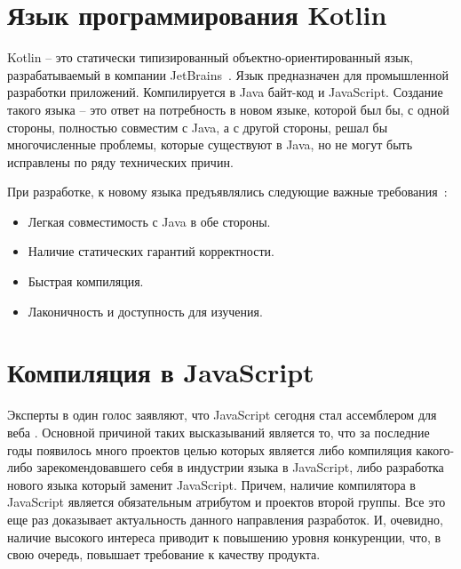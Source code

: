 


\section{Язык программирования Kotlin}

Kotlin -- это статически типизированный объектно-ориентированный язык, разрабатываемый в компании JetBrains~\cite{KotlinOSP}.
Язык предназначен для промышленной разработки приложений. Компилируется в Java байт-код и JavaScript.
Создание такого языка -- это ответ на потребность в новом языке, которой был бы, с одной стороны, полностью совместим с Java, а с другой стороны, решал бы многочисленные проблемы, которые существуют в Java, но не могут быть исправлены по ряду технических причин.

При разработке, к новому языка предъявлялись следующие важные требования~\cite{KotlinOSP}:
\begin{itemize}
	\item Легкая совместимость с Java в обе стороны.
	\item Наличие статических гарантий корректности.
	\item Быстрая компиляция.
	\item Лаконичность и доступность для изучения.
\end{itemize}






\section{Компиляция в JavaScript}

Эксперты в один голос заявляют, что JavaScript сегодня стал ассемблером для веба \cite{JsIsAsm1, JsIsAsm2}.
Основной причиной таких высказываний является то, что за последние годы появилось много проектов целью которых является либо компиляция какого-либо зарекомендовавшего себя в индустрии языка в JavaScript, либо разработка нового языка который заменит JavaScript. Причем, наличие компилятора в JavaScript является обязательным атрибутом и проектов второй группы.
Все это еще раз доказывает актуальность данного направления разработок. И, очевидно, наличие высокого интереса приводит к повышению уровня конкуренции, что, в свою очередь, повышает требование к качеству продукта.

